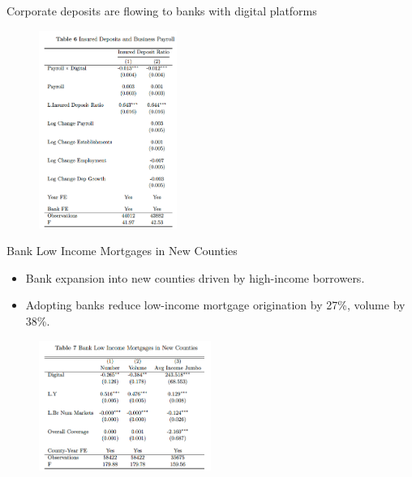 \documentclass[notes,10pt, aspectratio=169]{beamer}
\begin{document}
\begin{frame}{Corporate deposits are flowing to banks with digital platforms}

    \begin{figure}
    \centering
    \includegraphics[width=0.4\textwidth]{imgs/tab6.png}
    \end{figure}

\end{frame}

\begin{frame}{Bank Low Income Mortgages in New Counties}

\begin{itemize}
\item Bank expansion into new counties driven by high-income borrowers.
\item Adopting banks reduce low-income mortgage origination by 27\%, volume by 38\%.
\end{itemize}
    \begin{figure}
        \centering
        \includegraphics[width=0.5\textwidth]{imgs/tab7.png}
    \end{figure}
    
\end{frame}
\end{document}
